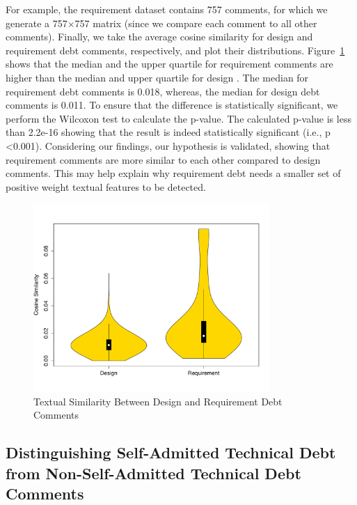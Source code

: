 For example, the requirement \SATD dataset contains 757 comments, for which we generate a 757$\times$757 matrix (since we compare each comment to all other comments).
Finally, we take the average cosine similarity for design and requirement debt comments, respectively, and plot their distributions.
Figure~\ref{fig:textual_similarity} shows that the median and the upper quartile for requirement \SATD comments are higher than the median and upper quartile for design \SATD.
The median for requirement debt comments is 0.018, whereas, the median for design debt comments is 0.011.
To ensure that the difference is statistically significant, we perform the Wilcoxon test to calculate the p-value. The calculated p-value is less than 2.2e-16 showing that the result is indeed statistically significant (i.e., p \textless 0.001). Considering our findings, our hypothesis is validated, showing that requirement \SATD comments are more similar to each other compared to design \SATD comments. This may help explain why requirement debt needs a smaller set of positive weight textual features to be detected.

\begin{figure}[!thb]
  \centering
  \includegraphics[width = 0.8\textwidth]{figures/chapter4/textual_similarity_removing_stop_words.pdf}
  \caption{Textual Similarity Between Design and Requirement Debt Comments}
  \label{fig:textual_similarity}
\end{figure}

\subsection{Distinguishing Self-Admitted Technical Debt from Non-Self-Admitted Technical Debt Comments}
\label{chap4:sec:coarse-grained_classes}

